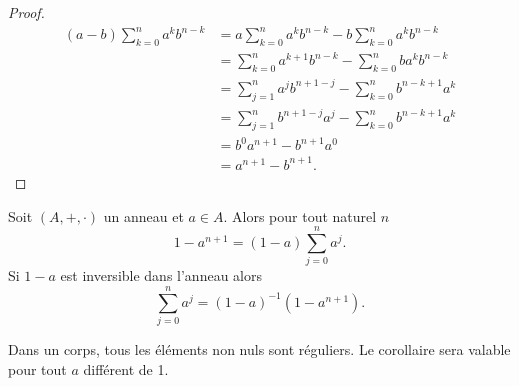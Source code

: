 \begin{proof}
  \begin{align}
    (a-b)\sum_{k=0}^n a^kb^{n-k} &= a \sum_{k=0}^n a^kb^{n-k} - b \sum_{k=0}^n a^kb^{n-k}\\
&=\sum_{k=0}^n a^{k+1}b^{n-k} - \sum_{k=0}^n ba^kb^{n-k}\\
&=\sum_{j=1}^n a^jb^{n+1-j} - \sum_{k=0}^n b^{n-k+1}a^k \\
&=\sum_{j=1}^n b^{n+1-j}a^j - \sum_{k=0}^n b^{n-k+1}a^k \\
&=b^0a^{n+1}-b^{n+1}a^0\\
&=a^{n+1}-b^{n+1}.
  \end{align}
\end{proof}
\begin{corth}
  Soit \((A,+,\cdot)\) un anneau et \(a \in A\). Alors pour tout naturel \(n\)
  \begin{equation}
    1-a^{n+1}=(1-a)\sum_{j=0}^n a^j.
  \end{equation}
  Si \(1-a\) est inversible dans l'anneau alors
  \begin{equation}
    \sum_{j=0}^n a^j = (1-a)^{-1}(1-a^{n+1}).
  \end{equation}
\end{corth}
Dans un corps, tous les éléments non nuls sont réguliers. Le corollaire sera valable pour tout \(a\) différent de 1.

